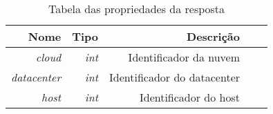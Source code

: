 \begin{table}[!htb]
    \centering
    \caption[Representação do Host de Resposta]{Tabela das propriedades da resposta
    \label{tab:tabela-optimization}}
    \begin{tabular}{rrrrr}
        \toprule
            Nome & Tipo & Descrição \\ 
        \midrule
            \textit{cloud} & \textit{int} & Identificador da nuvem \\
            \textit{datacenter} & \textit{int} & Identificador do datacenter \\
            \textit{host} & \textit{int} & Identificador do host \\
        \bottomrule
    \end{tabular}
\end{table}
